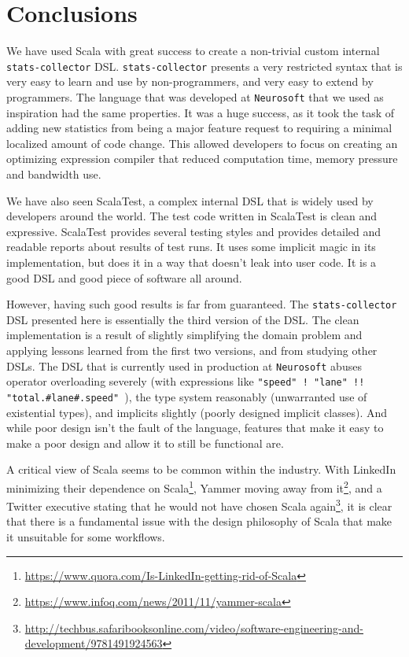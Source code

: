 \chapter{Conclusions}

We have used Scala with great success to create a non-trivial custom internal \texttt{stats-collector} DSL.
\texttt{stats-collector} presents a very restricted syntax that is very easy to learn and use by non-programmers, and very easy to extend by programmers.
The language that was developed at \texttt{Neurosoft} that we used as inspiration had the same properties.
It was a huge success, as it took the task of adding new statistics from being a major feature request to requiring a minimal localized amount of code change.
This allowed developers to focus on creating an optimizing expression compiler that reduced computation time, memory pressure and bandwidth use.

We have also seen ScalaTest, a complex internal DSL that is widely used by developers around the world.
The test code written in ScalaTest is clean and expressive.
ScalaTest provides several testing styles and provides detailed and readable reports about results of test runs.
It uses some implicit magic in its implementation, but does it in a way that doesn't leak into user code.
It is a good DSL and good piece of software all around.

However, having such good results is far from guaranteed.
The \texttt{stats-collector} DSL presented here is essentially the third version of the DSL.
The clean implementation is a result of slightly simplifying the domain problem and applying lessons learned from the first two versions, and from studying other DSLs.
The DSL that is currently used in production at \texttt{Neurosoft} abuses operator overloading severely (with expressions like \texttt{"speed" ! "lane" !! "total.\#lane\#.speed" }), the type system reasonably (unwarranted use of existential types), and implicits slightly (poorly designed implicit classes).
And while poor design isn't the fault of the language, features that make it easy to make a poor design and allow it to still be functional are.

A critical view of Scala seems to be common within the industry.
With LinkedIn minimizing their dependence on Scala\footnote{\url{https://www.quora.com/Is-LinkedIn-getting-rid-of-Scala}}, Yammer moving away from it\footnote{\url{https://www.infoq.com/news/2011/11/yammer-scala}}, and a Twitter executive stating that he would not have chosen Scala again\footnote{\url{http://techbus.safaribooksonline.com/video/software-engineering-and-development/9781491924563}}, it is clear that there is a fundamental issue with the design philosophy of Scala that make it unsuitable for some workflows.

